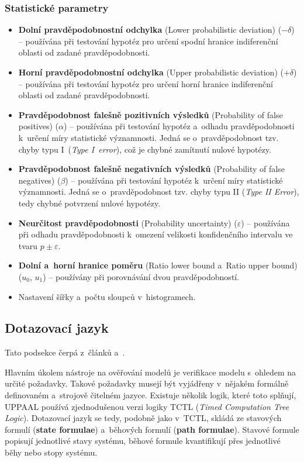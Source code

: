 \subsubsection{Statistické parametry}
\begin{itemize}
    \item \textbf{Dolní pravděpodobnostní odchylka} (Lower probabilistic deviation) ($-\delta$) -- používána při testování hypotéz pro určení spodní hranice indiferenční oblasti od zadané pravděpodobnosti.
    \item \textbf{Horní pravděpodobnostní odchylka} (Upper probabilistic deviation) ($+\delta$) -- používána při testování hypotéz pro určení horní hranice indiferenční oblasti od zadané pravděpodobnosti.
    \item \textbf{Pravděpodobnost falešně pozitivních výsledků} (Probability of false positives) ($\alpha$) -- používána při testování hypotéz a~odhadu pravděpodobnosti k~určení míry statistické významnosti. Jedná se o~pravděpodobnost tzv. chyby typu I~(\textit{Type I~error}), což je chybné zamítnutí nulové hypotézy.
    \item \textbf{Pravděpodobnost falešně negativních výsledků} (Probability of false negatives) ($\beta$) -- používána při testování hypotéz k~určení míry statistické významnosti. Jedná se o~pravděpodobnost tzv. chyby typu II (\textit{Type II Error}), tedy chybné potvrzení nulové hypotézy.
    \item \textbf{Neurčitost pravděpodobnosti} (Probability uncertainty) ($\varepsilon$) -- používána při odhadu pravděpodobnosti k~omezení velikosti konfidenčního intervalu ve tvaru $p \pm \varepsilon$.
    \item \textbf{Dolní a~horní hranice poměru} (Ratio lower bound a~Ratio upper bound) ($u_0$, $u_1$) -- používány při porovnávání dvou pravděpodobností.
    \item Nastavení šířky a~počtu sloupců v~histogramech.
\end{itemize}

\subsection{Dotazovací jazyk} \label{uppaal_query_lang}
Tato podsekce čerpá z~článků \cite{uppaal_intro} a~\cite{uppaal_smc}. 

Hlavním úkolem nástroje na ověřování modelů je verifikace modelu s~ohledem na určité požadavky. Takové požadavky musejí být vyjádřeny v~nějakém formálně definovaném a~strojově čitelném jazyce. Existuje několik logik, které toto splňují, UPPAAL používá zjednodušenou verzi logiky TCTL (\textit{Timed Computation Tree Logic}). Dotazovací jazyk se tedy, podobně jako v~TCTL, skládá ze stavových formulí (\textbf{state formulae}) a~běhových formulí (\textbf{path formulae}). Stavové formule popisují jednotlivé stavy systému, běhové formule kvantifikují přes jednotlivé běhy nebo stopy systému.

